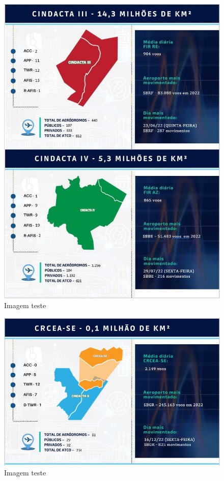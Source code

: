 \documentclass[
]{book}
\begin{document}
\begin{figure}
\centering
\includegraphics{imagens/fig4.jpg}
\caption{Imagem teste}
\end{figure}

\begin{figure}
\centering
\includegraphics{imagens/fig5.jpg}
\caption{Imagem teste}
\end{figure}
\end{document}

